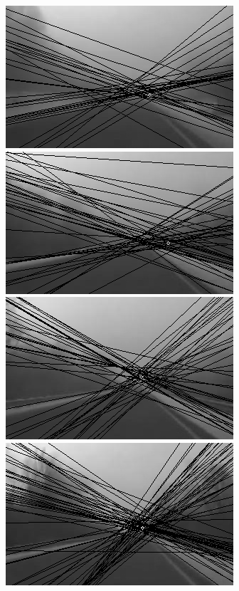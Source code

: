 \documentclass[12pt]{report}
\begin{document}
\begin{figure}[H]
\begin{minipage}[c]{0.5\linewidth}
	\centering
	\includegraphics[scale=\imTrackScale]{images/bF_0000_25.png}
	\includegraphics[scale=\imTrackScale]{images/bF_0020_25.png}
	\includegraphics[scale=\imTrackScale]{images/bF_0040_25.png}
	\includegraphics[scale=\imTrackScale]{images/bF_0060_25.png}
\end{minipage}
\begin{minipage}[c]{0.5\linewidth}

\end{minipage}
\end{figure}
\end{document}
